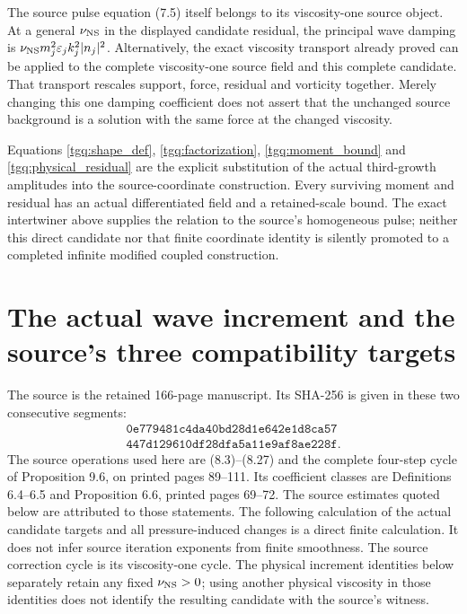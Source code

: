 The source pulse equation (7.5) itself belongs to its viscosity-one
source object. At a general $\nu_{\rm NS}$ in the displayed candidate
residual, the principal wave damping is
$\nu_{\rm NS}m_j^2\varepsilon_jk_j^2|n_j|^2$.
Alternatively, the exact viscosity transport already proved can be
applied to the complete viscosity-one source field and this complete
candidate. That transport rescales support, force, residual and
vorticity together. Merely changing this one damping coefficient
does not assert that the unchanged source background is a solution
with the same force at the changed viscosity.

Equations \eqref{tgq:shape_def}, \eqref{tgq:factorization},
\eqref{tgq:moment_bound} and \eqref{tgq:physical_residual} are the
explicit substitution of the actual third-growth amplitudes into
the source-coordinate construction. Every surviving moment and
residual has an actual differentiated field and a retained-scale
bound. The exact intertwiner above supplies the relation to the
source's homogeneous pulse; neither this direct candidate nor that
finite coordinate identity is silently promoted to a completed
infinite modified coupled construction.


\section{The actual wave increment and the source's three compatibility targets}
\label{momop:section}

The source is the retained 166-page manuscript. Its SHA-256 is given
in these two consecutive segments:
\[
\begin{gathered}
\texttt{0e779481c4da40bd28d1e642e1d8ca57}\\
\texttt{447d129610df28dfa5a11e9af8ae228f}.
\end{gathered}
\]
The source operations used here are (8.3)--(8.27) and the complete
four-step cycle of Proposition 9.6, on printed pages 89--111.
Its coefficient classes are Definitions 6.4--6.5 and Proposition 6.6,
printed pages 69--72. The source estimates quoted below are attributed
to those statements. The following calculation of the actual candidate
targets and all pressure-induced changes is a direct finite calculation.
It does not infer source iteration exponents from finite smoothness.
The source correction cycle is its viscosity-one cycle. The physical
increment identities below separately retain any fixed
$\nu_{\rm NS}>0$; using another physical viscosity in those identities
does not identify the resulting candidate with the source's witness.

